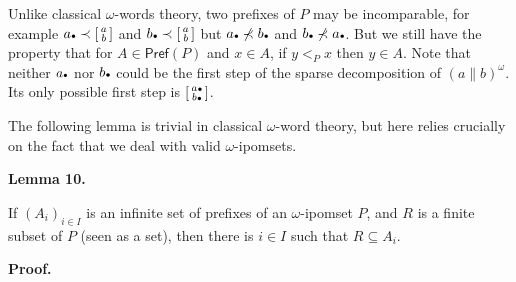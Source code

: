  
Unlike classical $\omega$-words theory, two prefixes of $P$ may be incomparable, for example $a\vbox{\hbox{\tiny$\bullet$}}\prec\left[\begin{smallmatrix}a\\
b\end{smallmatrix}\right]$ and $b\vbox{\hbox{\tiny$\bullet$}}\prec\left[\begin{smallmatrix}a\\
b\end{smallmatrix}\right]$ but $a\vbox{\hbox{\tiny$\bullet$}}\not\prec b\vbox{\hbox{\tiny$\bullet$}}$ and $b\vbox{\hbox{\tiny$\bullet$}}\not\prec a\vbox{\hbox{\tiny$\bullet$}}$. But we still have the property that for $A\in\mathsf{Pref}(P)$ and $x\in A$, if $y<_{P}x$ then $y\in A$. Note that neither $a\vbox{\hbox{\tiny$\bullet$}}$ nor $b\vbox{\hbox{\tiny$\bullet$}}$ could be the first step of the sparse decomposition of $(a\parallel b)^{\omega}$. Its only possible first step is $\left[\begin{smallmatrix}a\vbox{\hbox{\tiny$\bullet$}}\\
b\vbox{\hbox{\tiny$\bullet$}}\end{smallmatrix}\right]$.\par
 
 
 
 
The following lemma is trivial in classical $\omega$-word theory, but here relies crucially on the fact that we deal with valid $\omega$-ipomsets.\par
 
 
 
\par\medskip\noindent\textbf{Lemma 10.}\par
 
 
If $(A_{i})_{i\in I}$ is an infinite set of prefixes of an $\omega$-ipomset $P$, and $R$ is a finite subset of $P$ (seen as a set), then there is $i\in I$ such that $R\subseteq A_{i}$.\par
 
 
 
 
\par\medskip\noindent\textbf{Proof.}\par
 
